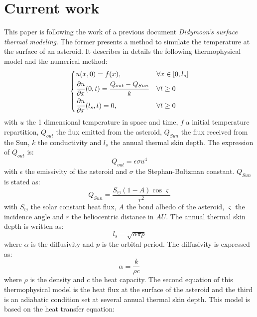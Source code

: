 \section{Current work}
\label{currentwork}

This paper is following the work of a previous document \textit{Didymoon's surface thermal modeling}. The former presents a method to simulate the temperature at the surface of an asteroid. It describes in details the following thermophysical model and the numerical method:
\begin{equation}
    \begin{dcases}
        u(x,0)=f(x),                                                  & \forall x\in[0,l_s] \\
        \frac{\partial{u}}{\partial{x}}(0,t)=\frac{Q_{out}-Q_{Sun}}{k} & \forall t\geq0      \\
        \frac{\partial{u}}{\partial{x}}(l_s,t)=0,                     & \forall t\geq0
    \end{dcases}
\end{equation}
with $u$ the 1 dimensional temperature in space and time, $f$ a initial temperature repartition, $Q_{out}$ the flux emitted from the asteroid, $Q_{Sun}$ the flux received from the Sun, $k$ the conductivity and $l_s$ the annual thermal skin depth. The expression of $Q_{out}$ is:
\begin{equation}
    Q_{out}=\epsilon\sigma u^4
\end{equation}
with $\epsilon$ the emissivity of the asteroid and $\sigma$ the Stephan-Boltzman constant. $Q_{Sun}$ is stated as:
\begin{equation}
    Q_{Sun}=\frac{S_{\odot}\left(1-A\right)\cos{\varsigma}}{r^2}
\end{equation}
with $S_{\odot}$ the solar constant heat flux, $A$ the bond albedo of the asteroid, $\varsigma$ the incidence angle and $r$ the heliocentric distance in $AU$. The annual thermal skin depth is written as:
\begin{equation}
    l_s=\sqrt{\alpha\pi p}
\end{equation}
where $\alpha$ is the diffusivity and $p$ is the orbital period. The diffusivity is expressed as:
\begin{equation}
    \alpha=\frac{k}{\rho c}
\end{equation}
where $\rho$ is the density and $c$ the heat capacity. The second equation of this thermophysical model is the heat flux at the surface of the asteroid and the third is an adiabatic condition set at several annual thermal skin depth. This model is based on the heat transfer equation:
